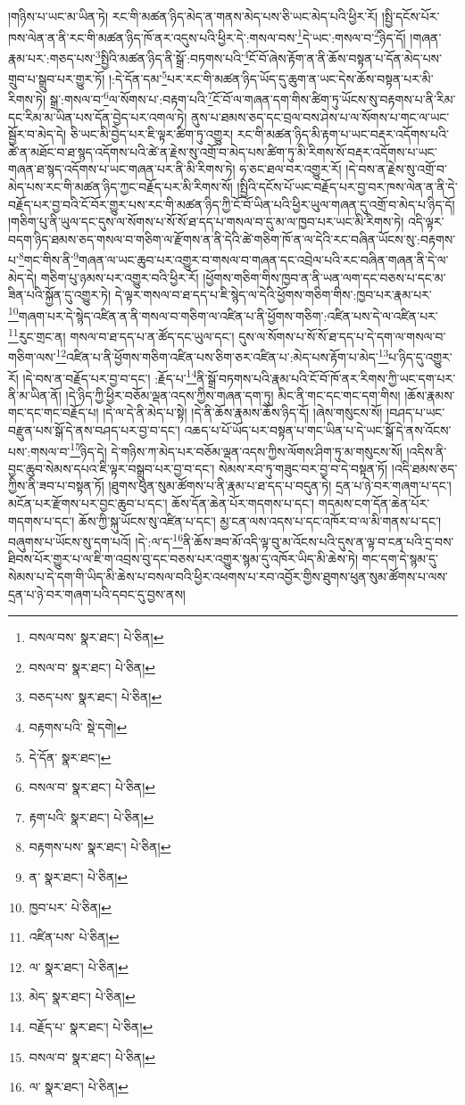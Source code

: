 །གཉིས་པ་ཡང་མ་ཡིན་ཏེ། རང་གི་མཚན་ཉིད་མེད་ན་གནས་མེད་པས་ཅི་ཡང་མེད་པའི་ཕྱིར་རོ། །སྤྱི་དངོས་པོར་ཁས་ལེན་ན་ནི་རང་གི་མཚན་ཉིད་ཁོ་ནར་འདུས་པའི་ཕྱིར་དེ་:གསལ་བས་\footnote{བསལ་བས་  སྣར་ཐང་།  པེ་ཅིན། }དེ་ཡང་:གསལ་བ་\footnote{བསལ་བ་  སྣར་ཐང་།  པེ་ཅིན། }ཉིད་དོ། །གཞན་རྣམ་པར་:གཅད་པས་\footnote{བཅད་པས་  སྣར་ཐང་།  པེ་ཅིན། }སྤྱིའི་མཚན་ཉིད་ནི་སྒྲོ་:བཏགས་པའི་\footnote{བརྟགས་པའི་  སྡེ་དགེ། }ངོ་བོ་ཞེས་རྟོག་ན་ནི་ཆོས་བསྟན་པ་དོན་མེད་པས་གྲུབ་པ་སྒྲུབ་པར་གྱུར་ཏོ། །:དེ་དོན་དམ་\footnote{དེ་དོན་  སྣར་ཐང་། }པར་རང་གི་མཚན་ཉིད་ཡོད་དུ་ཆུག་ན་ཡང་དེས་ཆོས་བསྟན་པར་མི་རིགས་ཏེ། སྒྲ་:གསལ་བ་\footnote{བསལ་བ་  སྣར་ཐང་།  པེ་ཅིན། }ལ་སོགས་པ་:བརྟག་པའི་\footnote{རྟག་པའི་  སྣར་ཐང་།  པེ་ཅིན། }ངོ་བོ་ལ་གཞན་དག་གིས་ཚིག་ཏུ་ཡོངས་སུ་བརྟགས་པ་ནི་རིམ་དང་རིམ་མ་ཡིན་པས་དོན་བྱེད་པར་འགལ་ཏེ། ནུས་པ་ཐམས་ཅད་དང་བྲལ་བས་ཤེས་པ་ལ་སོགས་པ་གང་ལ་ཡང་སྦྱོར་བ་མེད་དེ། ཅི་ཡང་མི་བྱེད་པར་ཇི་ལྟར་ཚིག་ཏུ་འགྱུར། རང་གི་མཚན་ཉིད་མི་རྟག་པ་ཡང་བརྡར་འདོགས་པའི་ཚེ་ན་མཐོང་བ་ཐ་སྙད་འདོགས་པའི་ཚེ་ན་རྗེས་སུ་འགྲོ་བ་མེད་པས་ཚིག་ཏུ་མི་རིགས་སོ་བརྡར་འདོགས་པ་ཡང་གཞན་ཐ་སྙད་འདོགས་པ་ཡང་གཞན་པར་ནི་མི་རིགས་ཏེ། ཧ་ཅང་ཐལ་བར་འགྱུར་རོ། །དེ་བས་ན་རྗེས་སུ་འགྲོ་བ་མེད་པས་རང་གི་མཚན་ཉིད་ཀྱང་བརྗོད་པར་མི་རིགས་སོ། །སྤྱིའི་དངོས་པོ་ཡང་བརྗོད་པར་བྱ་བར་ཁས་ལེན་ན་ནི་དེ་བརྗོད་པར་བྱ་བའི་ངོ་བོར་གྱུར་པས་རང་གི་མཚན་ཉིད་ཀྱི་ངོ་བོ་ཡིན་པའི་ཕྱིར་ཡུལ་གཞན་དུ་འགྲོ་བ་མེད་པ་ཉིད་དོ། །གཅིག་པུ་ནི་ཡུལ་དང་དུས་ལ་སོགས་པ་སོ་སོ་ཐ་དད་པ་གསལ་བ་དུ་མ་ལ་ཁྱབ་པར་ཡང་མི་རིགས་ཏེ། འདི་ལྟར་བདག་ཉིད་ཐམས་ཅད་གསལ་བ་གཅིག་ལ་རྫོགས་ན་ནི་དེའི་ཚེ་གཅིག་ཁོ་ན་ལ་དེའི་རང་བཞིན་ཡོངས་སུ་:བརྟགས་པ་\footnote{བརྟགས་པས་  སྣར་ཐང་།  པེ་ཅིན། }གང་གིས་ནི་\footnote{ན་  སྣར་ཐང་།  པེ་ཅིན། }གཞན་ལ་ཡང་ཆུབ་པར་འགྱུར་བ་གསལ་བ་གཞན་དང་འབྲེལ་པའི་རང་བཞིན་གཞན་ནི་དེ་ལ་མེད་དེ། གཅིག་པུ་ཉམས་པར་འགྱུར་བའི་ཕྱིར་རོ། །ཕྱོགས་གཅིག་གིས་ཁྱབ་ན་ནི་ཡན་ལག་དང་བཅས་པ་དང་མ་ཟིན་པའི་སྐྱོན་དུ་འགྱུར་ཏེ། དེ་ལྟར་གསལ་བ་ཐ་དད་པ་ཇི་སྙེད་ལ་དེའི་ཕྱོགས་གཅིག་གིས་:ཁྱབ་པར་རྣམ་པར་\footnote{ཁྱབ་པར་  པེ་ཅིན། }གཞག་པར་དེ་སྙེད་འཛིན་ན་ནི་གསལ་བ་གཅིག་ལ་འཛིན་པ་ནི་ཕྱོགས་གཅིག་:འཛིན་པས་དེ་ལ་འཛིན་པར་\footnote{འཛིན་པས་  པེ་ཅིན། }རུང་གྲང་ན། གསལ་བ་ཐ་དད་པ་ན་ཚོད་དང་ཡུལ་དང་། དུས་ལ་སོགས་པ་སོ་སོ་ཐ་དད་པ་དེ་དག་ལ་གསལ་བ་གཅིག་ལས་\footnote{ལ་  སྣར་ཐང་།  པེ་ཅིན། }འཛིན་པ་ནི་ཕྱོགས་གཅིག་འཛིན་པས་ཅིག་ཅར་འཛིན་པ་:མེད་པས་རྟོག་པ་མེད་\footnote{མེད་  སྣར་ཐང་།  པེ་ཅིན། }པ་ཉིད་དུ་འགྱུར་རོ། །དེ་བས་ན་བརྗོད་པར་བྱ་བ་དང་། :རྗོད་པ་\footnote{བརྗོད་པ་  སྣར་ཐང་།  པེ་ཅིན། }ནི་སྒྲོ་བཏགས་པའི་རྣམ་པའི་ངོ་བོ་ཁོ་ནར་རིགས་ཀྱི་ཡང་དག་པར་ནི་མ་ཡིན་ནོ། །དེ་ཉིད་ཀྱི་ཕྱིར་བཅོམ་ལྡན་འདས་ཀྱིས་གཞན་དག་ཏུ། མིང་ནི་གང་དང་གང་དག་གིས། །ཆོས་རྣམས་གང་དང་གང་བརྗོད་པ། །དེ་ལ་དེ་ནི་མེད་པ་སྟེ། །དེ་ནི་ཆོས་རྣམས་ཆོས་ཉིད་དོ། །ཞེས་གསུངས་སོ། །བཤད་པ་ཡང་བརྫུན་པས་སྒོ་དེ་ནས་བཤད་པར་བྱ་བ་དང་། འཆད་པ་པོ་ཡོད་པར་བསྟན་པ་གང་ཡིན་པ་དེ་ཡང་སྒོ་དེ་ནས་འོངས་པས་:གསལ་བ་\footnote{བསལ་བ་  སྣར་ཐང་།  པེ་ཅིན། }ཉིད་དེ། དེ་གཉིས་ཀ་མེད་པར་བཅོམ་ལྡན་འདས་ཀྱིས་ལོགས་ཤིག་ཏུ་མ་གསུངས་སོ། །འདིས་ནི་བྱང་ཆུབ་སེམས་དཔའ་ཇི་ལྟར་བསྒྲུབ་པར་བྱ་བ་དང་། སེམས་རབ་ཏུ་གཟུང་བར་བྱ་བ་དེ་བསྟན་ཏོ། །འདི་ཐམས་ཅད་ཀྱིས་ནི་ཟབ་པ་བསྟན་ཏོ། །ཐུགས་ཕུན་སུམ་ཚོགས་པ་ནི་རྣམ་པ་ཐ་དད་པ་བདུན་ཏེ། དྲན་པ་ཉེ་བར་གཞག་པ་དང་། མངོན་པར་རྫོགས་པར་བྱང་ཆུབ་པ་དང་། ཆོས་དོན་ཆེན་པོར་གདགས་པ་དང་། གདམས་ངག་དོན་ཆེན་པོར་གདགས་པ་དང་། ཆོས་ཀྱི་སྐུ་ཡོངས་སུ་འཛིན་པ་དང་། མྱ་ངན་ལས་འདས་པ་དང་འཁོར་བ་ལ་མི་གནས་པ་དང་། བཞུགས་པ་ཡོངས་སུ་དག་པའོ། །དེ་:ལ་ད་\footnote{ལ་  སྣར་ཐང་།  པེ་ཅིན། }ནི་ཆོས་ཟབ་མོ་འདི་ལྟ་བུ་མ་འོངས་པའི་དུས་ན་ལྟ་བ་ངན་པའི་དྲ་བས་ཐིབས་པོར་གྱུར་པ་ལ་ཇི་ག་འབྲས་བུ་དང་བཅས་པར་འགྱུར་སྙམ་དུ་འཁོར་ཡིད་མི་ཆེས་ཏེ། གང་དག་དེ་སྙམ་དུ་སེམས་པ་དེ་དག་གི་ཡིད་མི་ཆེས་པ་བསལ་བའི་ཕྱིར་འཕགས་པ་རབ་འབྱོར་གྱིས་ཐུགས་ཕུན་སུམ་ཚོགས་པ་ལས་དྲན་པ་ཉེ་བར་གཞག་པའི་དབང་དུ་བྱས་ནས། 